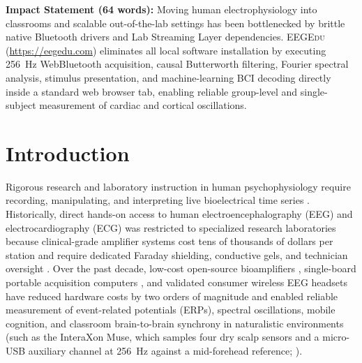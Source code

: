 \documentclass[11pt,letterpaper]{article}
\begin{document}
\begin{abstract}
\noindent\textbf{Keywords:} electroencephalography (EEG), electrocardiography (ECG), time--frequency analysis, event-related potentials (ERPs), brain--computer interface (BCI), WebBluetooth
\end{abstract}

\vspace{4pt}
\noindent\colorbox{codebg}{\parbox{0.98\textwidth}{\small\textbf{Impact Statement (64 words):} Moving human electrophysiology into classrooms and scalable out-of-the-lab settings has been bottlenecked by brittle native Bluetooth drivers and Lab Streaming Layer dependencies. \textsc{EEGEdu} (\url{https://eegedu.com}) eliminates all local software installation by executing 256~Hz WebBluetooth acquisition, causal Butterworth filtering, Fourier spectral analysis, stimulus presentation, and machine-learning BCI decoding directly inside a standard web browser tab, enabling reliable group-level and single-subject measurement of cardiac and cortical oscillations.}}
\vspace{6pt}

\section{Introduction}
Rigorous research and laboratory instruction in human psychophysiology require recording, manipulating, and interpreting live bioelectrical time series \citep{marzullo2012spikerbox,segawa2019hands,kuziek2017transitioning,mathewson2017high,keil2022recommendations}. Historically, direct hands-on access to human electroencephalography (EEG) and electrocardiography (ECG) was restricted to specialized research laboratories because clinical-grade amplifier systems cost tens of thousands of dollars per station and require dedicated Faraday shielding, conductive gels, and technician oversight \citep{luck2014introduction,mathewson2017high}. Over the past decade, low-cost open-source bioamplifiers \citep{marzullo2012spikerbox}, single-board portable acquisition computers \citep{kuziek2017transitioning,kuziek2018increasing}, and validated consumer wireless EEG headsets have reduced hardware costs by two orders of magnitude and enabled reliable measurement of event-related potentials (ERPs), spectral oscillations, mobile cognition, and classroom brain-to-brain synchrony in naturalistic environments (such as the InteraXon Muse, which samples four dry scalp sensors and a micro-USB auxiliary channel at 256~Hz against a mid-forehead reference; \citealp{debener2012,krigolson2017choosing,scanlon2017your,dikker2017brain,cannard2021validating}).
\end{document}
